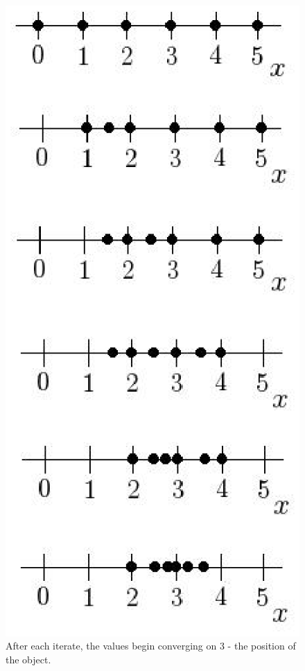 \documentclass[a4paper,12pt]{article}
\begin{document}
\begin{figure}[!h]
 \begin{center}
  \includegraphics[scale=0.75]{nsdiagram.eps}
  \caption{After each iterate, the values begin converging on 3 - the position of the object.}
 \end{center}
\end{figure}
\end{document}
